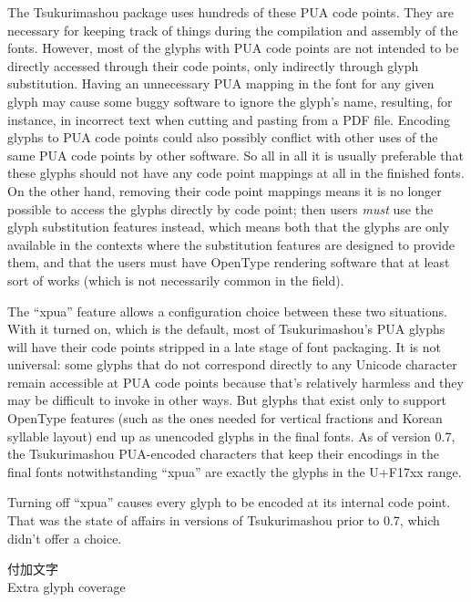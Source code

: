 \documentclass[14pt]{extarticle}
\newcommand{\blsection}[2]{%
\kaku\clearpage\Large\phantomsection%
\addcontentsline{toc}{section}{#1 #2}%
#1\\ #2\par\addpenalty{-300}\normalsize}
\begin{document}
The Tsukurimashou package uses hundreds of these PUA code points.  They are
necessary for keeping track of things during the compilation and assembly of
the fonts.  However, most of the glyphs with PUA code points are not
intended to be directly accessed through their code points, only indirectly
through glyph substitution.  Having an unnecessary PUA mapping in the font
for any given glyph may cause some buggy software to ignore the glyph's
name, resulting, for instance, in incorrect text when cutting and pasting
from a PDF file.  Encoding glyphs to PUA code points could also possibly
conflict with other uses of the same PUA code points by other software.  So
all in all it is usually preferable that these glyphs should not have any
code point mappings at all in the finished fonts.  On the other hand, removing
their code point mappings means it is no longer possible to access the
glyphs directly by code point; then users \emph{must} use the glyph
substitution features instead, which means both that the glyphs are only
available in the contexts where the substitution features are designed to
provide them, and that the users must have OpenType rendering software that
at least sort of works (which is not necessarily common in the field).

The ``xpua'' feature allows a configuration choice between these two
situations.  With it turned on, which is the default, most of
Tsukurimashou's PUA glyphs will have their code points stripped in a late
stage of font packaging.  It is not universal: some glyphs that do not
correspond directly to any Unicode character remain accessible at PUA code
points because that's relatively harmless and they may be difficult to
invoke in other ways.  But glyphs that exist only to support OpenType
features (such as the ones needed for vertical fractions and Korean syllable
layout) end up as unencoded glyphs in the final fonts.  As of version 0.7,
the Tsukurimashou PUA-encoded characters that keep their encodings in the
final fonts notwithstanding ``xpua'' are exactly the glyphs in the U+F17xx
range.

Turning off ``xpua'' causes every glyph to be encoded at its internal code
point.  That was the state of affairs in versions of Tsukurimashou prior to
0.7, which didn't offer a choice.


\blsection{付加文字}{Extra glyph coverage}
\end{document}
